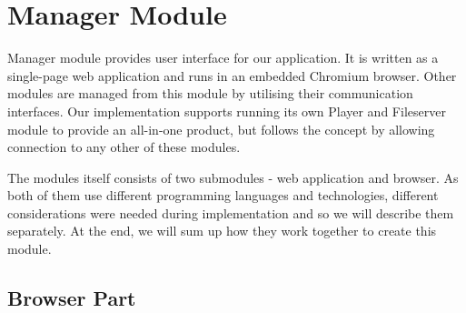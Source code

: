 \section{Manager Module}

Manager module provides user interface for our application. It is written as a single-page web application and runs in an embedded Chromium browser. Other modules are managed from this module by utilising their communication interfaces. Our implementation supports running its own Player and Fileserver module to provide an all-in-one product, but follows the concept by allowing connection to any other of these modules.
\par
The modules itself consists of two submodules - web application and browser. As both of them use different programming languages and technologies, different considerations were needed during implementation and so we will describe them separately. At the end, we will sum up how they work together to create this module.

\subsection{Browser Part}

